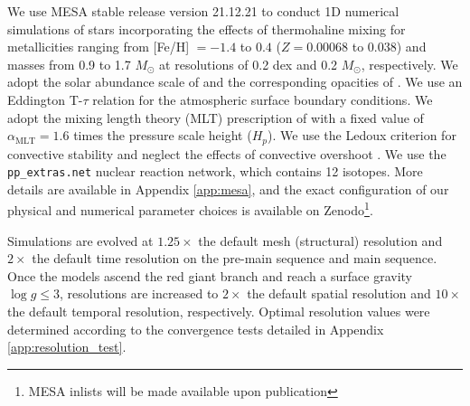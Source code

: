 %
%
%
We use MESA stable release version 21.12.21 to conduct 1D numerical simulations of stars incorporating the effects of thermohaline mixing for metallicities ranging from [Fe/H] $= -1.4$ to $0.4$ ($Z = 0.00068$ to $0.038$) and masses from 0.9 to 1.7 $M_{\odot}$ at resolutions of 0.2 dex and 0.2 $M_{\odot}$, respectively. We adopt the solar abundance scale of \citet{GrevesseSauval1998} and the corresponding opacities of \citet{IglesiasRogers1996}. We use an Eddington T-$\tau$ relation for the atmospheric surface boundary conditions.
We adopt the mixing length theory (MLT) prescription of \citet{Cox1980} with a fixed value of $\alpha_{\text{MLT}}= 1.6$ times the pressure scale height ($H_p$). We use the Ledoux criterion for convective stability and neglect the effects of convective overshoot \citep{Ledoux1947}. We use the \verb|pp_extras.net| nuclear reaction network, which contains 12 isotopes. More details are available in Appendix \ref{app:mesa}, and the exact configuration of our physical and numerical parameter choices is available on Zenodo\footnote{MESA inlists will be made available upon publication}. 

Simulations are evolved at $1.25\times$ the default mesh (structural) resolution and $2\times$ the default time resolution on the pre-main sequence and main sequence. Once the models ascend the red giant branch and reach a surface gravity $\log g \le 3$, resolutions are increased to $2\times$ the default spatial resolution and $10\times$ the default temporal resolution, respectively. Optimal resolution values were determined according to the convergence tests detailed in Appendix \ref{app:resolution_test}. 

